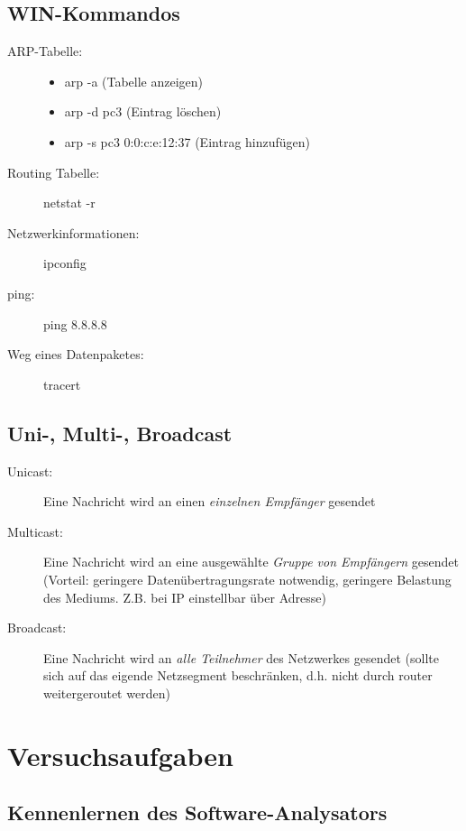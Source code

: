 \documentclass[11pt, a4paper]{article}
\begin{document}
\subsection{WIN-Kommandos}
\begin{description}
\item[ARP-Tabelle:]\begin{itemize}
                      \item arp -a (Tabelle anzeigen)
                      \item arp -d pc3 (Eintrag löschen)
                      \item arp -s pc3 0:0:c:e:12:37 (Eintrag hinzufügen)
                    \end{itemize}
\item[Routing Tabelle:] netstat -r
\item[Netzwerkinformationen:] ipconfig
\item[ping:] ping 8.8.8.8
\item[Weg eines Datenpaketes:] tracert
\end{description}

\subsection{Uni-, Multi-, Broadcast}\label{A4.9}
\begin{description}
        \item[Unicast:] Eine Nachricht wird an einen \emph{einzelnen Empfänger} gesendet
        \item[Multicast:] Eine Nachricht wird an eine ausgewählte \emph{Gruppe von Empfängern} gesendet (Vorteil: geringere Datenübertragungsrate notwendig, geringere Belastung des Mediums. Z.B. bei IP einstellbar über Adresse)
        \item[Broadcast:] Eine Nachricht wird an \emph{alle Teilnehmer} des Netzwerkes gesendet (sollte sich auf das eigende Netzsegment beschränken, d.h. nicht durch router weitergeroutet werden)
\end{description}

\pagebreak
\section{Versuchsaufgaben}
\subsection{Kennenlernen des Software-Analysators}

\end{document}
